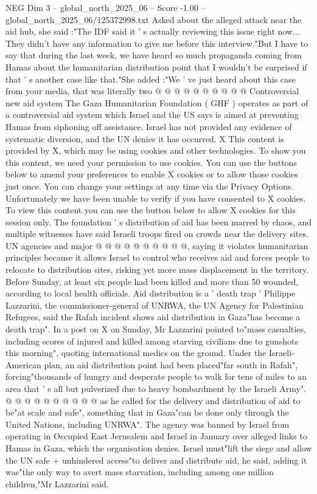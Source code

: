 \begin{textsample}{NEG Dim 3 – global\_north\_2025\_06 – Score -1.00 – global\_north\_2025\_06/125372998.txt}
Asked about the alleged attack near the aid hub, she said :"The IDF said it ' s actually reviewing this issue right now...
They didn't have any information to give me before this interview."But I have to say that during the last week, we have heard so much propaganda coming from Hamas about the humanitarian distribution point that I wouldn't be surprised if that ' s another case like that."She added :"We ' ve just heard about this case from your media, that was literally two @ @ @ @ @ @ @ @ @ @ Controversial new aid system The Gaza Humanitarian Foundation ( GHF ) operates as part of a controversial aid system which Israel and the US says is aimed at preventing Hamas from siphoning off assistance.
Israel has not provided any evidence of systematic diversion, and the UN denies it has occurred.
X This content is provided by X, which may be using cookies and other technologies.
To show you this content, we need your permission to use cookies.
You can use the buttons below to amend your preferences to enable X cookies or to allow those cookies just once.
You can change your settings at any time via the Privacy Options.
Unfortunately we have been unable to verify if you have consented to X cookies.
To view this content you can use the button below to allow X cookies for this session only.
The foundation ' s distribution of aid has been marred by chaos, and multiple witnesses have said Israeli troops fired on crowds near the delivery sites.
UN agencies and major @ @ @ @ @ @ @ @ @ @, saying it violates humanitarian principles because it allows Israel to control who receives aid and forces people to relocate to distribution sites, risking yet more mass displacement in the territory.
Before Sunday, at least six people had been killed and more than 50 wounded, according to local health officials.
Aid distribution is a ' death trap ' Philippe Lazzarini, the commissioner-general of UNRWA, the UN Agency for Palestinian Refugees, said the Rafah incident shows aid distribution in Gaza"has become a death trap".
In a post on X on Sunday, Mr Lazzarini pointed to"mass casualties, including scores of injured and killed among starving civilians due to gunshots this morning", quoting international medics on the ground.
Under the Israeli-American plan, an aid distribution point had been placed"far south in Rafah", forcing"thousands of hungry and desperate people to walk for tens of miles to an area that ' s all but pulverized due to heavy bombardment by the Israeli Army". @ @ @ @ @ @ @ @ @ @ as he called for the delivery and distribution of aid to be"at scale and safe", something that in Gaza"can be done only through the United Nations, including UNRWA".
The agency was banned by Israel from operating in Occupied East Jerusalem and Israel in January over alleged links to Hamas in Gaza, which the organisation denies.
Israel must"lift the siege and allow the UN safe + unhindered access"to deliver and distribute aid, he said, adding it was"the only way to avert mass starvation, including among one million children,"Mr Lazzarini said.

\end{textsample}
